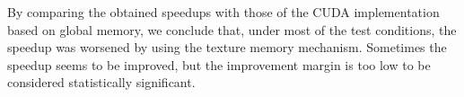 By comparing the obtained speedups with those of the CUDA implementation based on global memory, we conclude that, under most of the test conditions, the speedup was worsened by using the texture memory mechanism. Sometimes the speedup seems to be improved, but the improvement margin is too low to be considered statistically significant.